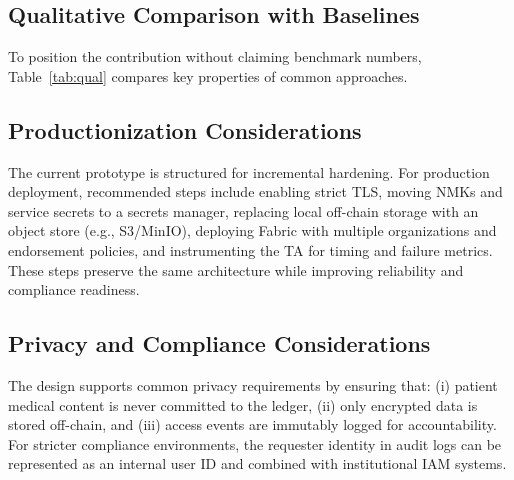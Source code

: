 \documentclass{IEEEtran}
\begin{document}
\subsection{Qualitative Comparison with Baselines}
To position the contribution without claiming benchmark numbers, Table~\ref{tab:qual} compares key properties of common approaches.
\begin{table}[!t]
\caption{Qualitative Comparison of Record Management Approaches}
\label{tab:qual}
\centering
\footnotesize
\setlength{\tabcolsep}{3pt}
\end{table}

\subsection{Productionization Considerations}
The current prototype is structured for incremental hardening. For production deployment, recommended steps include enabling strict TLS, moving NMKs and service secrets to a secrets manager, replacing local off-chain storage with an object store (e.g., S3/MinIO), deploying Fabric with multiple organizations and endorsement policies, and instrumenting the TA for timing and failure metrics. These steps preserve the same architecture while improving reliability and compliance readiness.

\subsection{Privacy and Compliance Considerations}
The design supports common privacy requirements by ensuring that: (i) patient medical content is never committed to the ledger, (ii) only encrypted data is stored off-chain, and (iii) access events are immutably logged for accountability. For stricter compliance environments, the requester identity in audit logs can be represented as an internal user ID and combined with institutional IAM systems.
\end{document}
